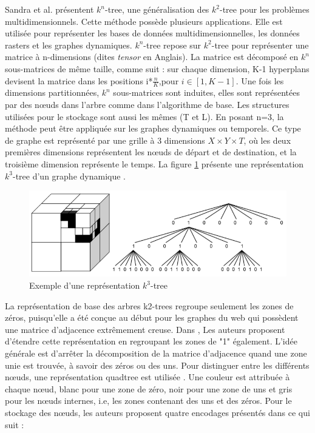  Sandra et al. \citep{de2013compact} présentent $k^n$-tree, une généralisation des $k^2$-tree pour les problèmes multidimensionnels. Cette méthode possède plusieurs applications. Elle est utilisée pour représenter les bases de données multidimensionnelles, les données rasters et les graphes dynamiques. $k^n$-tree repose sur $k^2$-tree pour représenter une matrice à n-dimensions (dites \textit{tensor} en Anglais). La matrice est décomposé en $k^n$ sous-matrices de même taille, comme suit : sur chaque dimension, K-1 hyperplans devisent la matrice dans les positions i*$\frac{n}{K}$,pour $i \in [1, K-1]$. Une fois les dimensions partitionnées, $k^n$ sous-matrices sont induites, elles sont représentées par des nœuds dans l'arbre comme dans l'algorithme de base. Les structures utilisées pour le stockage sont aussi les mêmes (T et L).
En posant n=3, la méthode peut être appliquée sur les graphes dynamiques ou temporels. Ce type de graphe est représenté par une grille à 3 dimensions $X \times Y \times T$, où les deux premières dimensions représentent les nœuds de départ et de destination, et la troisième dimension représente le temps. 
La figure \ref{kn-trees} présente une représentation $k^3$-tree d'un graphe dynamique \citep{de2014new}.

\begin{figure}[H]
\begin{center}
\includegraphics[height=100 pt, width=380 pt]{./ressources/image/kn-trees.png} 
\end{center}
\caption{Exemple d'une représentation $k^3$-tree}
\label{kn-trees}
\end{figure}



La représentation de base des arbres k2-trees regroupe seulement les zones de zéros, puisqu'elle a été conçue au début pour les graphes du web qui possèdent une matrice d'adjacence extrêmement creuse. Dans \citep{de2014new}, Les auteurs proposent d'étendre cette représentation en regroupant les zones de "1" également. L'idée générale est d'arrêter la décomposition de la matrice d'adjacence quand une zone unie est trouvée, à savoir des zéros ou des uns. Pour distinguer entre les différents nœuds, une représentation quadtree est utilisée \citep{de1997computational}. Une couleur est attribuée à chaque nœud, blanc pour une zone de zéro, noir pour une zone de uns et gris pour les nœuds internes, i.e, les zones contenant des uns et des zéros. Pour le stockage des nœuds, les auteurs proposent quatre encodages présentés dans ce qui suit : 

